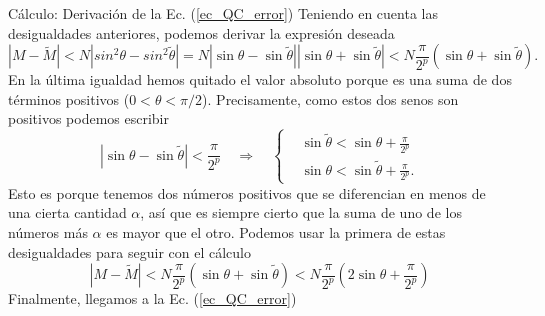 \documentclass[a4paper,11pt]{book} %
\numberwithin{equation}{chapter}
\def\lp{\left(}
\def\rp{\right)}
\def\lch{\left\{}
\def\rqa{\quad \Rightarrow \quad}
\begin{document}
	\begin{mybox_green}{Cálculo: Derivación de la Ec. (\ref{ec_QC_error})}
	Teniendo en cuenta las desigualdades anteriores, podemos derivar la expresión deseada
	\begin{equation*}
	|M - \tilde{M}|  < N \left| sin^2 \theta - sin^2 \tilde{\theta}  \right|  =   
	N \left| \sin \theta -  \sin \tilde{\theta} \right| 
	\left| \sin \theta + \sin \tilde{\theta} \right|   < 
	N \frac{\pi}{2^p} \lp \sin \theta + \sin \tilde{\theta} \rp.
	\end{equation*}
	En la última igualdad hemos quitado el valor absoluto porque es una suma de dos 
	términos positivos ($0 < \theta < \pi/2$). Precisamente, como estos dos senos son 
	positivos podemos escribir
	\begin{equation*}
	\left| \sin \theta - \sin \tilde{\theta} \right| < \frac{\pi}{2^p} \rqa
	\lch \begin{matrix}
		& \sin \tilde{\theta} <  \sin \theta + \frac{\pi}{2^p} \\
		& \sin \theta <  \sin \tilde{\theta} + \frac{\pi}{2^p} .
	\end{matrix} \right. 
	\end{equation*}
	Esto es porque tenemos dos números positivos que se diferencian en menos de una cierta 
	cantidad $\alpha$, así que es siempre cierto que la suma de uno de los números más 
	$\alpha$ es mayor que el otro. Podemos usar la primera de estas desigualdades para 
	seguir con el cálculo
	\begin{equation}
	|M - \tilde{M}|  < N \frac{\pi}{2^p} \lp \sin \theta + \sin \tilde{\theta}  \rp < 
	N \frac{\pi}{2^p} \lp 2 \sin \theta +\frac{\pi}{2^p} \rp
	\end{equation}
	Finalmente, llegamos a la Ec. (\ref{ec_QC_error})
	\end{mybox_green}
\end{document}
